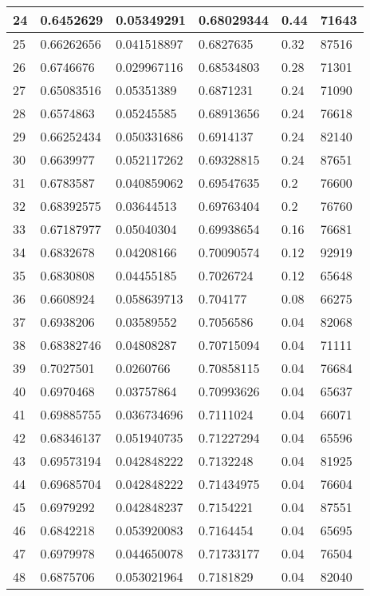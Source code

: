 \begin{longtable}{|l|l|l|l|l|l|}
24 & 0.6452629 & 0.05349291 & 0.68029344 & 0.44 & 71643 \\ \hline 
25 & 0.66262656 & 0.041518897 & 0.6827635 & 0.32 & 87516 \\ \hline 
26 & 0.6746676 & 0.029967116 & 0.68534803 & 0.28 & 71301 \\ \hline 
27 & 0.65083516 & 0.05351389 & 0.6871231 & 0.24 & 71090 \\ \hline 
28 & 0.6574863 & 0.05245585 & 0.68913656 & 0.24 & 76618 \\ \hline 
29 & 0.66252434 & 0.050331686 & 0.6914137 & 0.24 & 82140 \\ \hline 
30 & 0.6639977 & 0.052117262 & 0.69328815 & 0.24 & 87651 \\ \hline 
31 & 0.6783587 & 0.040859062 & 0.69547635 & 0.2 & 76600 \\ \hline 
32 & 0.68392575 & 0.03644513 & 0.69763404 & 0.2 & 76760 \\ \hline 
33 & 0.67187977 & 0.05040304 & 0.69938654 & 0.16 & 76681 \\ \hline 
34 & 0.6832678 & 0.04208166 & 0.70090574 & 0.12 & 92919 \\ \hline 
35 & 0.6830808 & 0.04455185 & 0.7026724 & 0.12 & 65648 \\ \hline 
36 & 0.6608924 & 0.058639713 & 0.704177 & 0.08 & 66275 \\ \hline 
37 & 0.6938206 & 0.03589552 & 0.7056586 & 0.04 & 82068 \\ \hline 
38 & 0.68382746 & 0.04808287 & 0.70715094 & 0.04 & 71111 \\ \hline 
39 & 0.7027501 & 0.0260766 & 0.70858115 & 0.04 & 76684 \\ \hline 
40 & 0.6970468 & 0.03757864 & 0.70993626 & 0.04 & 65637 \\ \hline 
41 & 0.69885755 & 0.036734696 & 0.7111024 & 0.04 & 66071 \\ \hline 
42 & 0.68346137 & 0.051940735 & 0.71227294 & 0.04 & 65596 \\ \hline 
43 & 0.69573194 & 0.042848222 & 0.7132248 & 0.04 & 81925 \\ \hline 
44 & 0.69685704 & 0.042848222 & 0.71434975 & 0.04 & 76604 \\ \hline 
45 & 0.6979292 & 0.042848237 & 0.7154221 & 0.04 & 87551 \\ \hline 
46 & 0.6842218 & 0.053920083 & 0.7164454 & 0.04 & 65695 \\ \hline 
47 & 0.6979978 & 0.044650078 & 0.71733177 & 0.04 & 76504 \\ \hline 
48 & 0.6875706 & 0.053021964 & 0.7181829 & 0.04 & 82040 \\ \hline 

\end{longtable}
